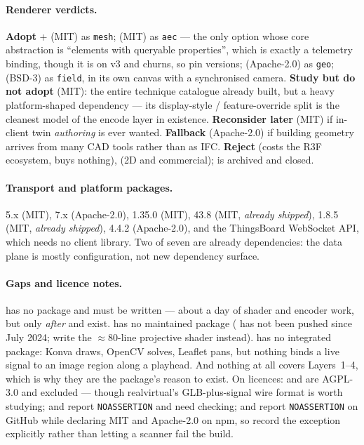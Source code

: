 \paragraph{Renderer verdicts.} \textbf{Adopt} + (MIT)
as \texttt{mesh};  (MIT) as \texttt{aec} --- the only option
whose core abstraction is ``elements with queryable properties'', which is exactly a
telemetry binding, though it is on v3 and churns, so pin versions; 
(Apache-2.0) as \texttt{geo};  (BSD-3) as \texttt{field}, in its own canvas
with a synchronised camera. \textbf{Study but do not adopt}  (MIT): the
entire technique catalogue already built, but a heavy platform-shaped dependency --- its
display-style / feature-override split is the cleanest model of the encode layer in
existence. \textbf{Reconsider later}  (MIT) if in-client twin
\emph{authoring} is ever wanted. \textbf{Fallback}  (Apache-2.0) if
building geometry arrives from many CAD tools rather than as IFC. \textbf{Reject}
 (costs the R3F ecosystem, buys nothing),  (2D and
commercial);  is archived and closed.

\paragraph{Transport and platform packages.}  5.x (MIT), 
7.x (Apache-2.0),  1.35.0 (MIT),
 43.8 (MIT, \emph{already shipped}),  1.8.5 (MIT,
\emph{already shipped}),  4.4.2 (Apache-2.0), and the ThingsBoard WebSocket
API, which needs no client library. Two of seven are already dependencies: the data
plane is mostly configuration, not new dependency surface.

\paragraph{Gaps and licence notes.}  has no package and must be written --- about
a day of shader and encoder work, but only \emph{after}  and  exist.
 has no maintained package ( has not been pushed
since July 2024; write the $\approx$80-line projective shader instead).  has no
integrated package: Konva draws, OpenCV solves, Leaflet pans, but nothing binds a live
signal to an image region along a playhead. And nothing at all covers Layers~1--4, which
is why they are the package's reason to exist. On licences:  and
 are AGPL-3.0 and excluded --- though realvirtual's GLB-plus-signal
wire format is worth studying;  and  report
\texttt{NOASSERTION} and need checking;  and  report
\texttt{NOASSERTION} on GitHub while declaring MIT and Apache-2.0 on npm, so record the
exception explicitly rather than letting a scanner fail the build.

